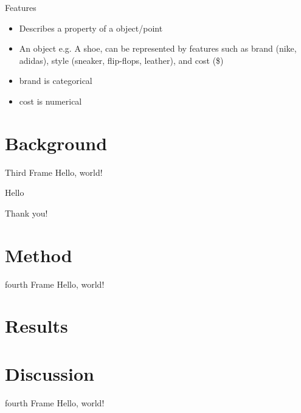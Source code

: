 \documentclass{beamer}
\begin{document}
\begin{frame}{Features}
\begin{itemize}
  \item Describes a property of a object/point \pause
  \item An object e.g. A shoe, can be represented by features such as \alert{brand} (nike, adidas), \alert{style} (sneaker, flip-flops, leather), and \alert{cost} (\$) \pause
  \item \alert{brand} is \alert{categorical}
  \item \alert{cost} is \alert{numerical}

\end{itemize}
\end{frame}


\section{Background}


\begin{frame}{Third Frame}
Hello, world!
\begin{example}
  Hello
\end{example}
\end{frame}


\begin{frame}[standout]
  Thank you!
\end{frame}


\section{Method}


\begin{frame}{fourth Frame}
Hello, world!
\end{frame}


\section{Results}


\section{Discussion}


\begin{frame}{fourth Frame}
Hello, world!
\end{frame}
\end{document}
